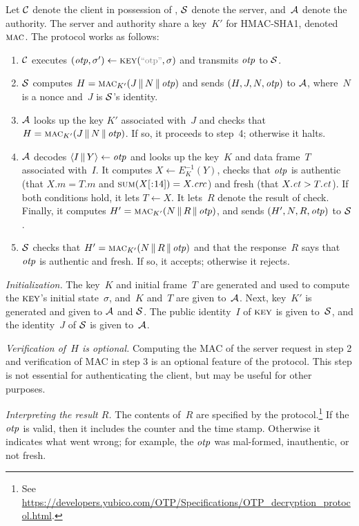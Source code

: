 Let $\mathcal{C}$ denote the client in possession of \key, $\mathcal{S}$ denote the
server, and~$\mathcal{A}$ denote the authority.
%
The server and authority share a key~$K'$ for HMAC-SHA1, denoted $\textsc{mac}$. The
protocol works as follows:
%
\begin{enumerate}
  \item $\mathcal{C}$ executes $(\otp, \sigma') \gets \key(\stringer{otp}, \sigma)$
    and transmits $\mathit{otp}$ to $\mathcal{S}$.

  \item $\mathcal{S}$ computes $H = \textsc{mac}_{K'}(J \, \| \, N \, \| \, \mathit{otp})$ and sends $(H, J,
    N, \mathit{otp})$ to $\mathcal{A}$, where~$N$ is a nonce and~$J$ is $\mathcal{S}$'s identity.

  \item $\mathcal{A}$ looks up the key $K'$ associated with~$J$ and checks that $H =
    \textsc{mac}_{K'}(J \, \| \, N \, \| \, \mathit{otp})$. If so, it proceeds to step~4; otherwise it
    halts.

  \item $\mathcal{A}$ decodes $\str(I\cat Y) \gets \otp$ and looks up the key~$K$ and
    data frame~$T$ associated with~$I$.
    It computes $X \gets E_K^{-1}(Y)$, checks that $\mathit{otp}$ is authentic (that $X.m =
    T.m$ and $\checksum(\substr(X,,14))=X.\crc$) and fresh (that $X.\mathit{ct} > T.\mathit{ct}$).
    If both conditions hold, it lets $T \gets X$.  It lets~$R$ denote the result
    of check. Finally, it computes $H' = \textsc{mac}_{K'}(N \, \| \, R \, \| \, \mathit{otp})$, and sends $(H',
    N, R, \mathit{otp})$ to $\mathcal{S}$.

  \item $\mathcal{S}$ checks that $H' = \textsc{mac}_{K'}(N \, \| \, R \, \| \, \mathit{otp})$ and that the
    response~$R$ says that $\mathit{otp}$ is authentic and fresh. If so, it accepts;
    otherwise it rejects.
\end{enumerate}

\textit{Initialization.}
The key~$K$ and initial frame~$T$ are generated and used to compute the $\textsc{key}$'s
initial state~$\sigma$, and~$K$ and~$T$ are given to~$\mathcal{A}$.
%
Next, key~$K'$ is generated and given to $\mathcal{A}$ and $\mathcal{S}$.
%
The public identity~$I$ of $\textsc{key}$ is given to~$\mathcal{S}$, and the identity~$J$ of
$\mathcal{S}$ is given to~$\mathcal{A}$.

\textit{Verification of~$H$ is optional.}
%
Computing the MAC of the server request in step 2 and verification of MAC in
step 3 is an optional feature of the protocol. This step is not essential for
authenticating the client, but may be useful for other purposes.

\textit{Interpreting the result $R$.}
%
The contents of~$R$ are specified by the protocol.\footnote{See
\url{https://developers.yubico.com/OTP/Specifications/OTP_decryption_protocol.html}.}
If the $\mathit{otp}$ is valid, then it includes the counter and the time stamp.
Otherwise it indicates what went wrong; for example, the $\mathit{otp}$ was mal-formed,
inauthentic, or not fresh.

